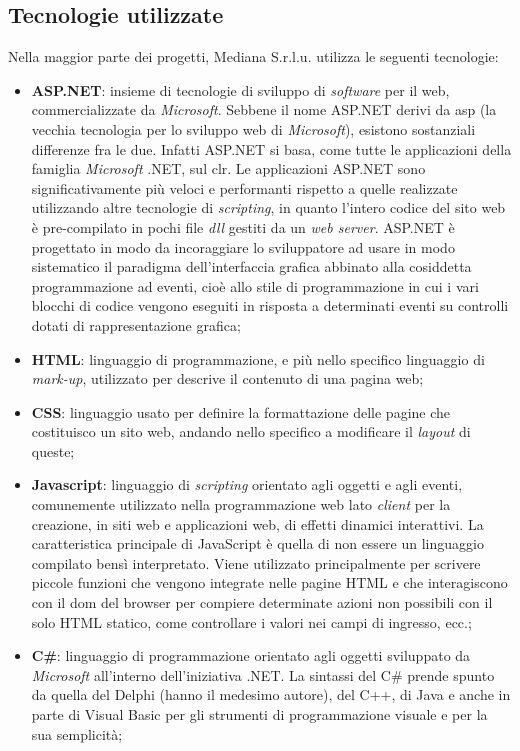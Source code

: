\subsection{Tecnologie utilizzate}
\label{tecnologie}
Nella maggior parte dei progetti, Mediana S.r.l.u. utilizza le seguenti tecnologie:
\begin{itemize}
\item \textbf{ASP.NET}: insieme di tecnologie di sviluppo di \textit{software} per il web, commercializzate da \textit{Microsoft}. Sebbene il nome ASP.NET derivi da \acrshort{asp} (la vecchia tecnologia per lo sviluppo web di \textit{Microsoft}), esistono sostanziali differenze fra le due. Infatti ASP.NET si basa, come tutte le applicazioni della famiglia \textit{Microsoft} .NET, sul \acrshort{clr}. Le applicazioni ASP.NET sono significativamente più veloci e performanti rispetto a quelle realizzate utilizzando altre tecnologie di \textit{scripting}, in quanto l'intero codice del sito web è pre-compilato in pochi file \textit{dll} gestiti da un \textit{web server}. ASP.NET è progettato in modo da incoraggiare lo sviluppatore ad usare in modo sistematico il paradigma dell'interfaccia grafica abbinato alla cosiddetta programmazione ad eventi, cioè allo stile di programmazione in cui i vari blocchi di codice vengono eseguiti in risposta a determinati eventi su controlli dotati di rappresentazione grafica;
\item \textbf{HTML}: linguaggio di programmazione, e più nello specifico linguaggio di \textit{mark-up}, utilizzato per descrive il contenuto di una pagina web;
\item \textbf{CSS}: linguaggio usato per definire la formattazione delle pagine che costituisco un sito web, andando nello specifico a modificare il \textit{layout} di queste;
\item \textbf{Javascript}: linguaggio di \textit{scripting} orientato agli oggetti e agli eventi, comunemente utilizzato nella programmazione web lato \textit{client} per la creazione, in siti web e applicazioni web, di effetti dinamici interattivi. La caratteristica principale di JavaScript è quella di non essere un linguaggio compilato bensì interpretato. Viene utilizzato principalmente per scrivere piccole funzioni che vengono integrate nelle pagine HTML e che interagiscono con il \acrshort{dom} del browser per compiere determinate azioni non possibili con il solo HTML statico, come controllare i valori nei campi di ingresso, ecc.;
\item \textbf{C\#}: linguaggio di programmazione orientato agli oggetti sviluppato da \textit{Microsoft} all'interno dell'iniziativa .NET. La sintassi del C\# prende spunto da quella del Delphi (hanno il medesimo autore), del C++, di Java e anche in parte di Visual Basic per gli strumenti di programmazione visuale e per la sua semplicità;

\end{itemize}
